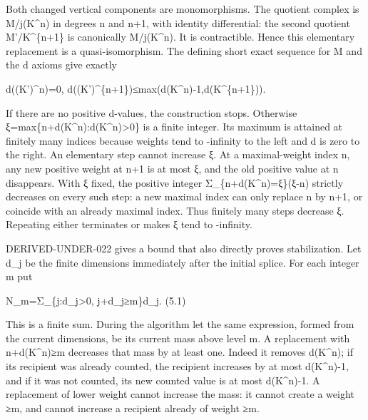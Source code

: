 Both changed vertical components are monomorphisms. The quotient complex is M/\allowbreak{}j(K\textasciicircum{}n)\allowbreak{} in degrees n and n\allowbreak{}+1,\allowbreak{} with identity differential:\allowbreak{} the second quotient M'/\allowbreak{}K\textasciicircum{}\{n\allowbreak{}+1\} is canonically M/\allowbreak{}j(K\textasciicircum{}n)\allowbreak{}. It is contractible. Hence this elementary replacement is a quasi-isomorphism. The defining short exact sequence for M\textquotesingle{} and the d axioms give exactly

d((K')\allowbreak{}\textasciicircum{}n)\allowbreak{}\allowbreak{}=0,\allowbreak{} d((K')\allowbreak{}\textasciicircum{}\{n\allowbreak{}+1\})\allowbreak{}≤max(d(K\textasciicircum{}n)\allowbreak{}-1,\allowbreak{}d(K\textasciicircum{}\{n\allowbreak{}+1\})\allowbreak{})\allowbreak{}.

If there are no positive d-values,\allowbreak{} the construction stops. Otherwise ξ\allowbreak{}=max\{n\allowbreak{}+d(K\textasciicircum{}n)\allowbreak{}:\allowbreak{}d(K\textasciicircum{}n)\allowbreak{}>0\} is a finite integer. Its maximum is attained at finitely many indices because weights tend to -infinity to the left and d is zero to the right. An elementary step cannot increase ξ. At a maximal-weight index n,\allowbreak{} any new positive weight at n\allowbreak{}+1 is at most ξ,\allowbreak{} and the old positive value at n disappears. With ξ fixed,\allowbreak{} the positive integer Σ\_\allowbreak{}\{n\allowbreak{}+d(K\textasciicircum{}n)\allowbreak{}\allowbreak{}=ξ\}(ξ-n)\allowbreak{} strictly decreases on every such step:\allowbreak{} a new maximal index can only replace n by n\allowbreak{}+1,\allowbreak{} or coincide with an already maximal index. Thus finitely many steps decrease ξ. Repeating either terminates or makes ξ tend to -infinity.

DERIVED-UNDER-022 gives a bound that also directly proves stabilization. Let d\_\allowbreak{}j be the finite dimensions immediately after the initial splice. For each integer m put

N\_\allowbreak{}m\allowbreak{}=Σ\_\allowbreak{}\{j:\allowbreak{}d\_\allowbreak{}j>0,\allowbreak{} j\allowbreak{}+d\_\allowbreak{}j≥m\}d\_\allowbreak{}j. (5.1)\allowbreak{}

This is a finite sum. During the algorithm let the same expression,\allowbreak{} formed from the current dimensions,\allowbreak{} be its current mass above level m. A replacement with n\allowbreak{}+d(K\textasciicircum{}n)\allowbreak{}≥m decreases that mass by at least one. Indeed it removes d(K\textasciicircum{}n)\allowbreak{}; if its recipient was already counted,\allowbreak{} the recipient increases by at most d(K\textasciicircum{}n)\allowbreak{}-1,\allowbreak{} and if it was not counted,\allowbreak{} its new counted value is at most d(K\textasciicircum{}n)\allowbreak{}-1. A replacement of lower weight cannot increase the mass:\allowbreak{} it cannot create a weight ≥m,\allowbreak{} and cannot increase a recipient already of weight ≥m.

